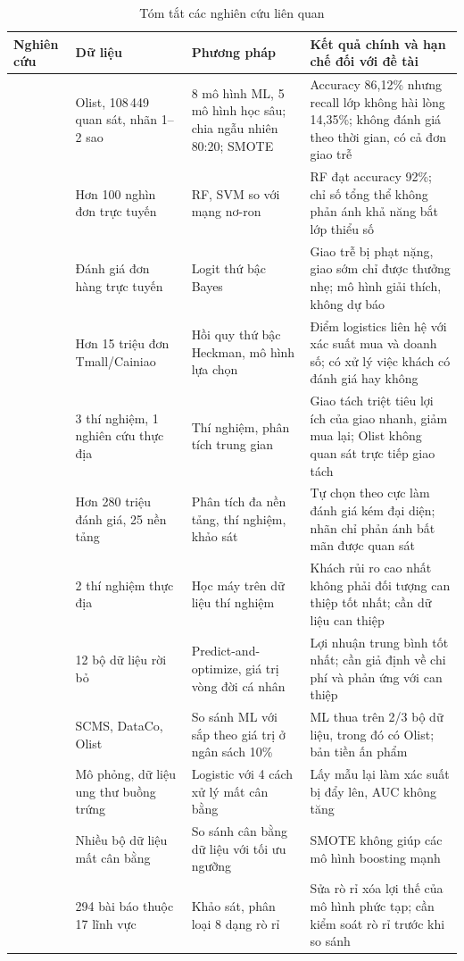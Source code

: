 \begin{table}[htbp]\centering\footnotesize
\caption{Tóm tắt các nghiên cứu liên quan}\label{tab:related}
\begin{tabular}{p{2.5cm}p{3.0cm}p{3.4cm}p{5.3cm}}
\toprule
Nghiên cứu & Dữ liệu & Phương pháp & Kết quả chính và hạn chế đối với đề tài \\
\midrule
\textcite{orman2026} & Olist, 108\,449 quan sát, nhãn 1--2 sao & 8 mô hình ML, 5 mô hình học sâu; chia ngẫu nhiên 80:20; SMOTE & Accuracy 86,12\% nhưng recall lớp không hài lòng 14,35\%; không đánh giá theo thời gian, có cả đơn giao trễ \\
\textcite{zaghloul2024} & Hơn 100 nghìn đơn trực tuyến & RF, SVM so với mạng nơ-ron & RF đạt accuracy 92\%; chỉ số tổng thể không phản ánh khả năng bắt lớp thiểu số \\
\textcite{ravula2023} & Đánh giá đơn hàng trực tuyến & Logit thứ bậc Bayes & Giao trễ bị phạt nặng, giao sớm chỉ được thưởng nhẹ; mô hình giải thích, không dự báo \\
\textcite{deshpande2023} & Hơn 15 triệu đơn Tmall/Cainiao & Hồi quy thứ bậc Heckman, mô hình lựa chọn & Điểm logistics liên hệ với xác suất mua và doanh số; có xử lý việc khách có đánh giá hay không \\
\textcite{brylla2022} & 3 thí nghiệm, 1 nghiên cứu thực địa & Thí nghiệm, phân tích trung gian & Giao tách triệt tiêu lợi ích của giao nhanh, giảm mua lại; Olist không quan sát trực tiếp giao tách \\
\textcite{schoenmueller2020} & Hơn 280 triệu đánh giá, 25 nền tảng & Phân tích đa nền tảng, thí nghiệm, khảo sát & Tự chọn theo cực làm đánh giá kém đại diện; nhãn chỉ phản ánh bất mãn được quan sát \\
\textcite{ascarza2018} & 2 thí nghiệm thực địa & Học máy trên dữ liệu thí nghiệm & Khách rủi ro cao nhất không phải đối tượng can thiệp tốt nhất; cần dữ liệu can thiệp \\
\textcite{gomezvargas2025} & 12 bộ dữ liệu rời bỏ & Predict-and-optimize, giá trị vòng đời cá nhân & Lợi nhuận trung bình tốt nhất; cần giả định về chi phí và phản ứng với can thiệp \\
\textcite{li2026valuesorting} & SCMS, DataCo, Olist & So sánh ML với sắp theo giá trị ở ngân sách 10\% & ML thua trên 2/3 bộ dữ liệu, trong đó có Olist; bản tiền ấn phẩm \\
\textcite{vandengoorbergh2022} & Mô phỏng, dữ liệu ung thư buồng trứng & Logistic với 4 cách xử lý mất cân bằng & Lấy mẫu lại làm xác suất bị đẩy lên, AUC không tăng \\
\textcite{elor2022smote} & Nhiều bộ dữ liệu mất cân bằng & So sánh cân bằng dữ liệu với tối ưu ngưỡng & SMOTE không giúp các mô hình boosting mạnh \\
\textcite{kapoor2023} & 294 bài báo thuộc 17 lĩnh vực & Khảo sát, phân loại 8 dạng rò rỉ & Sửa rò rỉ xóa lợi thế của mô hình phức tạp; cần kiểm soát rò rỉ trước khi so sánh \\
\bottomrule
\end{tabular}
\end{table}

